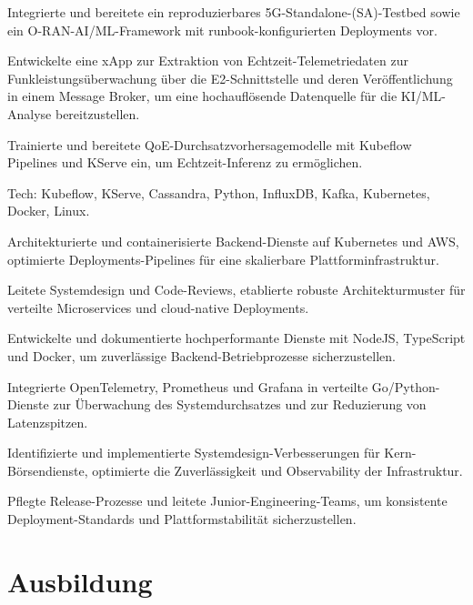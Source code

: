 \documentclass[10pt,a4paper]{resume}
\begin{document}
\bullets
  \item Integrierte und bereitete ein reproduzierbares 5G-Standalone-(SA)-Testbed sowie ein O-RAN-AI/ML-Framework mit runbook-konfigurierten Deployments vor.
  \item Entwickelte eine xApp zur Extraktion von Echtzeit-Telemetriedaten zur Funkleistungsüberwachung über die E2-Schnittstelle und deren Veröffentlichung in einem Message Broker, um eine hochauflösende Datenquelle für die KI/ML-Analyse bereitzustellen.
  \item Trainierte und bereitete QoE-Durchsatzvorhersagemodelle mit Kubeflow Pipelines und KServe ein, um Echtzeit-Inferenz zu ermöglichen.
  \item Tech: Kubeflow, KServe, Cassandra, Python, InfluxDB, Kafka, Kubernetes, Docker, Linux.
\bulletsend
\vspace{1.5pt}
\bullets
  \item Architekturierte und containerisierte Backend-Dienste auf Kubernetes und AWS, optimierte Deployments-Pipelines für eine skalierbare Plattforminfrastruktur.
  \item Leitete Systemdesign und Code-Reviews, etablierte robuste Architekturmuster für verteilte Microservices und cloud-native Deployments.
  \item Entwickelte und dokumentierte hochperformante Dienste mit NodeJS, TypeScript und Docker, um zuverlässige Backend-Betriebprozesse sicherzustellen.
\bulletsend
\vspace{1.5pt}
\bullets
  \item Integrierte OpenTelemetry, Prometheus und Grafana in verteilte Go/Python-Dienste zur Überwachung des Systemdurchsatzes und zur Reduzierung von Latenzspitzen.
  \item Identifizierte und implementierte Systemdesign-Verbesserungen für Kern-Börsendienste, optimierte die Zuverlässigkeit und Observability der Infrastruktur.
  \item Pflegte Release-Prozesse und leitete Junior-Engineering-Teams, um konsistente Deployment-Standards und Plattformstabilität sicherzustellen.
\bulletsend
\vspace{1.5pt}

\section{Ausbildung}
\end{document}
